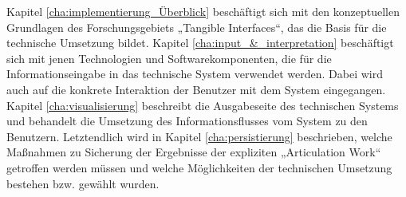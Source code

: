 Kapitel \ref{cha:implementierung_Überblick} beschäftigt sich mit den konzeptuellen Grundlagen des Forschungsgebiets „Tangible Interfaces“, das die Basis für die technische Umsetzung bildet. Kapitel \ref{cha:input_&_interpretation} beschäftigt sich mit jenen Technologien und Softwarekomponenten, die für die Informationseingabe in das technische System verwendet werden. Dabei wird auch auf die konkrete Interaktion der Benutzer mit dem System eingegangen. Kapitel \ref{cha:visualisierung} beschreibt die Ausgabeseite des technischen Systems und behandelt die Umsetzung des Informationsflusses vom System zu den Benutzern. Letztendlich wird in Kapitel \ref{cha:persistierung} beschrieben, welche Maßnahmen zu Sicherung der Ergebnisse der expliziten „Articulation Work“ getroffen werden müssen und welche Möglichkeiten der technischen Umsetzung bestehen bzw. gewählt wurden.











